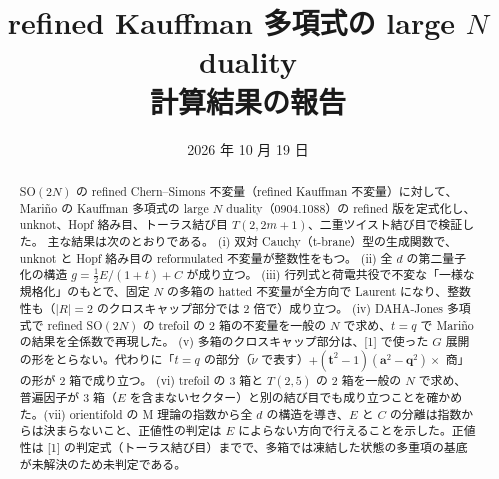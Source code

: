 \documentclass[a4paper,10pt]{ltjsarticle}
\title{refined Kauffman 多項式の large $N$ duality\\計算結果の報告}
\author{}
\date{2026 年 10 月 19 日}
\newcommand{\ba}{\bm{a}}
\newcommand{\bq}{\bm{q}}
\newcommand{\bt}{\bm{t}}
\newcommand{\tnu}{\tilde\nu}
\begin{document}
\maketitle

\begin{abstract}
SO$(2N)$ の refined Chern--Simons 不変量（refined Kauffman 不変量）に対して、Mariño の Kauffman 多項式の large $N$ duality（0904.1088）の refined 版を定式化し、unknot、Hopf 絡み目、トーラス結び目 $T(2,2m+1)$、二重ツイスト結び目で検証した。
主な結果は次のとおりである。
(i) 双対 Cauchy（t-brane）型の生成関数で、unknot と Hopf 絡み目の reformulated 不変量が整数性をもつ。
(ii) 全 $d$ の第二量子化の構造 $g = \tfrac12 E/(1+t) + C$ が成り立つ。
(iii) 行列式と荷電共役で不変な「一様な規格化」のもとで、固定 $N$ の多箱の hatted 不変量が全方向で Laurent になり、整数性も（$|R| = 2$ のクロスキャップ部分では 2 倍で）成り立つ。
(iv) DAHA-Jones 多項式で refined SO$(2N)$ の trefoil の 2 箱の不変量を一般の $N$ で求め、$t = q$ で Mariño の結果を全係数で再現した。
(v) 多箱のクロスキャップ部分は、[1] で使った $G$ 展開の形をとらない。代わりに「$t = q$ の部分（$\tnu$ で表す）$+ (\bt^2 - 1)(\ba^2 - \bq^2) \times$ 商」の形が 2 箱で成り立つ。
(vi) trefoil の 3 箱と $T(2,5)$ の 2 箱を一般の $N$ で求め、普遍因子が 3 箱（$E$ を含まないセクター）と別の結び目でも成り立つことを確かめた。(vii) orientifold の M 理論の指数から全 $d$ の構造を導き、$E$ と $C$ の分離は指数からは決まらないこと、正値性の判定は $E$ によらない方向で行えることを示した。正値性は [1] の判定式（トーラス結び目）までで、多箱では凍結した状態の多重項の基底が未解決のため未判定である。
\end{abstract}

\tableofcontents
\end{document}
